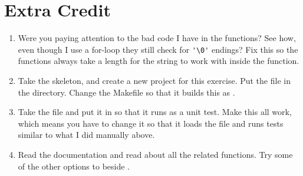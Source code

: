 \section{Extra Credit}

\begin{enumerate}
\item Were you paying attention to the bad code I have in the  functions?
    See how, even though I use a for-loop they still check for \verb|'\0'|
    endings?  Fix this so the functions always take a length for the
    string to work with inside the function.
\item Take the  skeleton, and create a new project
    for this exercise.  Put the  file in the 
    directory.  Change the Makefile so that it builds this as .
\item Take the  file and put it in  so
    that it runs as a unit test.  Make this all work, which means you have to
    change it so that it loads the  file and runs
    tests similar to what I did manually above.
\item Read the  documentation and read about all the
    related functions.  Try some of the other options to 
    beside .
\end{enumerate}

